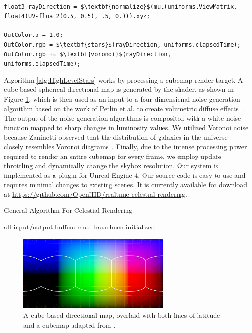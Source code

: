 \documentclass{vgtc}                         %
\begin{document}
\begin{lstlisting}[caption={Fragment Shader for Celestial Rendering}, label={lst:shader}, float]

float3 rayDirection = $\textbf{normalize}$(mul(uniforms.ViewMatrix, float4(UV-float2(0.5, 0.5), .5, 0.))).xyz;

OutColor.a = 1.0;
OutColor.rgb = $\textbf{stars}$(rayDirection, uniforms.elapsedTime);
OutColor.rgb += $\textbf{voronoi}$(rayDirection, uniforms.elapsedTime);

\end{lstlisting}

Algorithm \ref{alg:HighLevelStars} works by processing a cubemap render target. A cube based spherical directional map is generated by the shader, as shown in Figure \ref{fig:cubemap}, which is then used as an input to a four dimensional noise generation algorithm based on the work of Perlin et al. to create volumetric diffuse effects~\cite{Perlin:2002}. The output of the noise generation algorithms is composited with a white noise function mapped to sharp changes in luminosity values. We utilized Varonoi noise because Zaninetti observed that the distribution of galaxies in the universe closely resembles Voronoi diagrams~\cite{Zaninetti:2013fa}.  Finally, due to the intense processing power required to render an entire cubemap for every frame, we employ update throttling and dynamically change the skybox resolution. Our system is implemented as a plugin for Unreal Engine 4. Our source code is easy to use and requires minimal changes to existing scenes. It is currently available for download at \url{https://github.com/OpenHID/realtime-celestial-rendering}. 



\begin{algorithm}[tbh]                      %
	\caption{General Algorithm For Celestial Rendering}          %
	\label{alg:HighLevelStars}                           %
	\begin{algorithmic}[1]                    %
    \Ensure all input/output buffers must have been initialized
	\EndFor	
	\end{algorithmic}
\end{algorithm}
\begin{figure}[ht]
  \centering
  \includegraphics[width=3.0in]{../images/directioncubemap}
  \caption{A cube based directional map, overlaid with both lines of latitude and a cubemap adapted from \cite{EpicCube2016}.}
  \label{fig:cubemap}
\end{figure}
\end{document}
